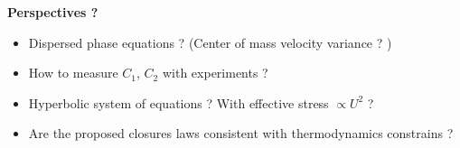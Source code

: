 \documentclass{sintefbeamer}
\begin{document}
\begin{frame}
  \centering
  {\Huge\textbf{Perspectives ? }}

  \begin{itemize}
    \item Dispersed phase equations ? (Center of mass velocity variance ? )
    \item How to measure $C_1$, $C_2$ with experiments  ?
    \item Hyperbolic system of equations ? With effective stress $\propto U^2$ ?
    \item Are the proposed closures laws consistent with thermodynamics constrains ?
  \end{itemize}

\end{frame}
\backmatter

\begin{frame}
  \footnotesize

  

\end{frame}
\end{document}
